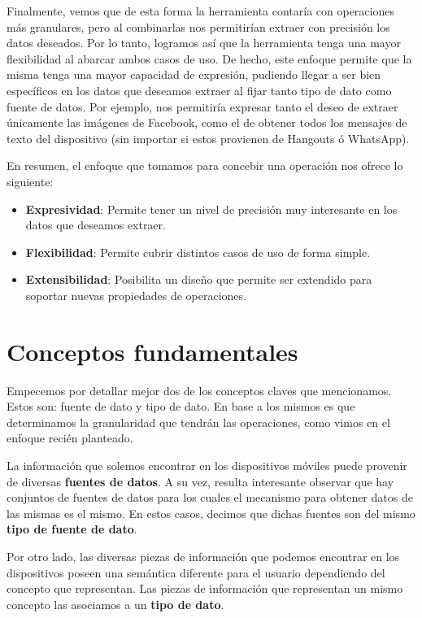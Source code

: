 Finalmente, vemos que de esta forma la herramienta contaría con operaciones más granulares, pero al combinarlas nos permitirían extraer con precisión los datos deseados. Por lo tanto, logramos así que la herramienta tenga una mayor flexibilidad al abarcar ambos casos de uso. De hecho, este enfoque permite que la misma tenga una mayor capacidad de expresión, pudiendo llegar a ser bien específicos en los datos que deseamos extraer al fijar tanto tipo de dato como fuente de datos. Por ejemplo, nos permitiría expresar tanto el deseo de extraer únicamente las imágenes de Facebook, como el de obtener todos los mensajes de texto del dispositivo (sin importar si estos provienen de Hangouts ó WhatsApp).

En resumen, el enfoque que tomamos para concebir una operación nos ofrece lo siguiente:

\begin{itemize}
\item \textbf{Expresividad}: Permite tener un nivel de precisión muy interesante en los datos que deseamos extraer.
\item \textbf{Flexibilidad}: Permite cubrir distintos casos de uso de forma simple.
\item \textbf{Extensibilidad}: Posibilita un diseño que permite ser extendido para soportar nuevas propiedades de operaciones.
\end{itemize}

\section{Conceptos fundamentales}
\label{conceptos_fundamentales}
Empecemos por detallar mejor dos de los conceptos claves que mencionamos. Estos son: fuente de dato y tipo de dato. En base a los mismos es que determinamos la granularidad que tendrán las operaciones, como vimos en el enfoque recién planteado.

La información que solemos encontrar en los dispositivos móviles puede provenir de diversas \textbf{fuentes de datos}. A su vez, resulta interesante observar que hay conjuntos de fuentes de datos para los cuales el mecanismo para obtener datos de las mismas es el mismo. En estos casos, decimos que dichas fuentes son del mismo \textbf{tipo de fuente de dato}.

Por otro lado, las diversas piezas de información que podemos encontrar en los dispositivos poseen una semántica diferente para el usuario dependiendo del concepto que representan. Las piezas de información que representan un mismo concepto las asociamos a un \textbf{tipo de dato}.

